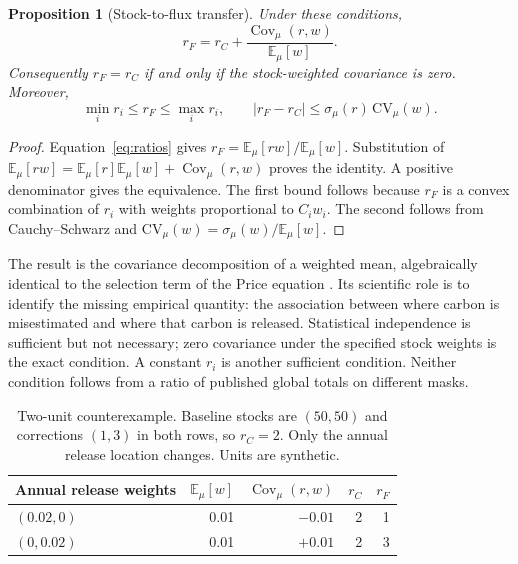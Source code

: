 \documentclass[11pt,a4paper]{article}
\newcommand{\E}{\mathbb{E}}
\DeclareMathOperator{\Cov}{Cov}
\newtheorem{proposition}{Proposition}[section]
\theoremstyle{remark}
\begin{document}
\begin{proposition}[Stock-to-flux transfer]\label{prop:transfer}
Under these conditions,
\begin{equation}
\boxed{r_F=r_C+\frac{\Cov_\mu(r,w)}{\E_\mu[w]}.}
\label{eq:transfer}
\end{equation}
Consequently $r_F=r_C$ if and only if the stock-weighted covariance is zero. Moreover,
\begin{equation}
\min_i r_i\leq r_F\leq\max_i r_i,
\qquad |r_F-r_C|\leq\sigma_\mu(r)\,\mathrm{CV}_\mu(w).
\label{eq:bound}
\end{equation}
\end{proposition}
\begin{proof}
Equation~\eqref{eq:ratios} gives $r_F=\E_\mu[rw]/\E_\mu[w]$. Substitution of $\E_\mu[rw]=\E_\mu[r]\E_\mu[w]+\Cov_\mu(r,w)$ proves the identity. A positive denominator gives the equivalence. The first bound follows because $r_F$ is a convex combination of $r_i$ with weights proportional to $C_iw_i$. The second follows from Cauchy--Schwarz and $\mathrm{CV}_\mu(w)=\sigma_\mu(w)/\E_\mu[w]$.
\end{proof}

The result is the covariance decomposition of a weighted mean, algebraically identical to the selection term of the Price equation \citep{Price1970}. Its scientific role is to identify the missing empirical quantity: the association between where carbon is misestimated and where that carbon is released. Statistical independence is sufficient but not necessary; zero covariance under the specified stock weights is the exact condition. A constant $r_i$ is another sufficient condition. Neither condition follows from a ratio of published global totals on different masks.

\begin{table}[htbp]
\centering\small
\caption{Two-unit counterexample. Baseline stocks are $(50,50)$ and corrections $(1,3)$ in both rows, so $r_C=2$. Only the annual release location changes. Units are synthetic.}
\label{tab:counter}
\begin{tabular}{@{}lrrrr@{}}
\toprule
Annual release weights & $\E_\mu[w]$ & $\Cov_\mu(r,w)$ & $r_C$ & $r_F$\\
\midrule
$(0.02,0)$ & 0.01 & $-0.01$ & 2 & 1\\
$(0,0.02)$ & 0.01 & $+0.01$ & 2 & 3\\
\bottomrule
\end{tabular}
\end{table}
\end{document}
